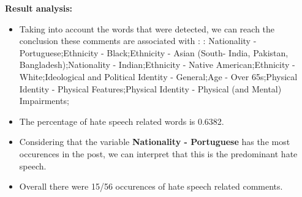 \documentclass[11pt]{article}
\begin{document}
\textbf{\Large Result analysis:}

\begin{itemize}\item Taking into account the words that were detected, we can reach the conclusion these comments are associated with : : Nationality - Portuguese;Ethnicity - Black;Ethnicity - Asian (South- India, Pakistan, Bangladesh);Nationality - Indian;Ethnicity - Native American;Ethnicity - White;Ideological and Political Identity - General;Age - Over 65s;Physical Identity - Physical Features;Physical Identity - Physical (and Mental) Impairments;%

\item The percentage of hate speech related words is 0.6382.

\item Considering that the variable \textbf{Nationality - Portuguese} has the most occurences in the post, we can interpret that this is the predominant hate speech.

\item Overall there were 15/56 occurences of hate speech related comments.\end{itemize}
\end{document}

